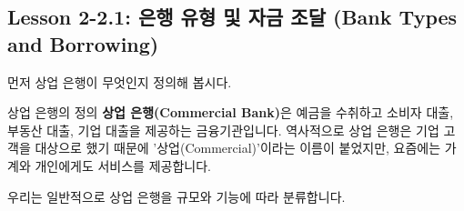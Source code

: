 \documentclass[11pt,a4paper]{article}
\begin{document}
\subsection{Lesson 2-2.1: 은행 유형 및 자금 조달 (Bank Types and Borrowing)}

먼저 상업 은행이 무엇인지 정의해 봅시다.
\begin{summarybox}{상업 은행의 정의}
\textbf{상업 은행(Commercial Bank)}은 예금을 수취하고 소비자 대출, 부동산 대출, 기업 대출을 제공하는 금융기관입니다. 역사적으로 상업 은행은 기업 고객을 대상으로 했기 때문에 '상업(Commercial)'이라는 이름이 붙었지만, 요즘에는 가계와 개인에게도 서비스를 제공합니다.
\end{summarybox}

우리는 일반적으로 상업 은행을 규모와 기능에 따라 분류합니다.
\end{document}
